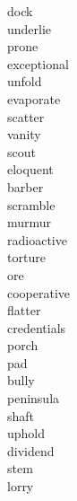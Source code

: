 \documentclass[a4paper, 11pt]{ctexart}
\begin{document}
\begin{multicols*}{3}
\begin{description}
\item[dock]

\item[underlie]

\item[prone]

\item[exceptional]

\item[unfold]

\item[evaporate]

\item[scatter]

\item[vanity]

\item[scout]

\item[eloquent]

\item[barber]

\item[scramble]

\item[murmur]

\item[radioactive]

\item[torture]

\item[ore]

\item[cooperative]

\item[flatter]

\item[credentials]

\item[porch]

\item[pad]

\item[bully]

\item[peninsula]

\item[shaft]

\item[uphold]

\item[dividend]

\item[stem]

\item[lorry]


\end{description}
\end{multicols*}
\end{document}
